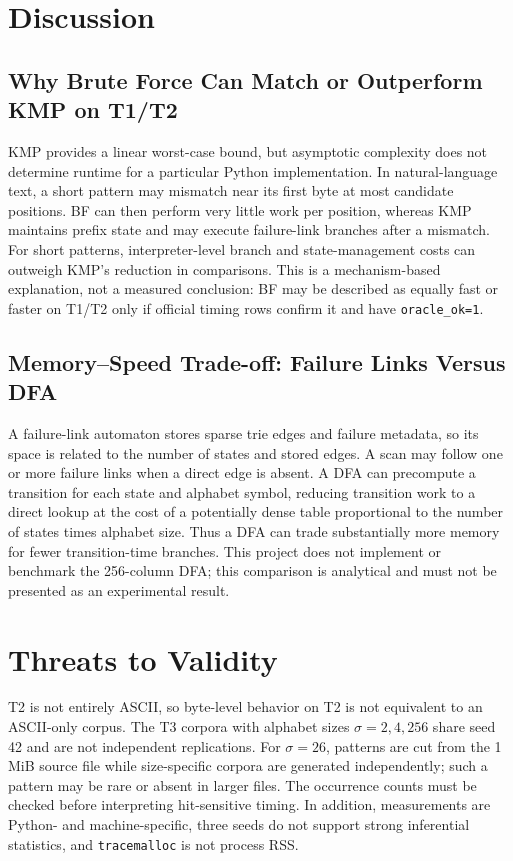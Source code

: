 \documentclass[conference]{IEEEtran}
\begin{document}
\section{Discussion}
\subsection{Why Brute Force Can Match or Outperform KMP on T1/T2}
KMP provides a linear worst-case bound, but asymptotic complexity does not
determine runtime for a particular Python implementation. In natural-language
text, a short pattern may mismatch near its first byte at most candidate
positions. BF can then perform very little work per position, whereas KMP
maintains prefix state and may execute failure-link branches after a mismatch.
For short patterns, interpreter-level branch and state-management costs can
outweigh KMP's reduction in comparisons. This is a mechanism-based explanation,
not a measured conclusion: BF may be described as equally fast or faster on
T1/T2 only if official timing rows confirm it and have \texttt{oracle\_ok=1}.

\subsection{Memory--Speed Trade-off: Failure Links Versus DFA}
A failure-link automaton stores sparse trie edges and failure metadata, so its
space is related to the number of states and stored edges. A scan may follow
one or more failure links when a direct edge is absent. A DFA can precompute a
transition for each state and alphabet symbol, reducing transition work to a
direct lookup at the cost of a potentially dense table proportional to the
number of states times alphabet size. Thus a DFA can trade substantially more
memory for fewer transition-time branches. This project does not implement or
benchmark the 256-column DFA; this comparison is analytical and must not be
presented as an experimental result.

\section{Threats to Validity}
T2 is not entirely ASCII, so byte-level behavior on T2 is not equivalent to an
ASCII-only corpus. The T3 corpora with alphabet sizes $\sigma=2,4,256$ share
seed 42 and are not independent replications. For $\sigma=26$, patterns are
cut from the 1 MiB source file while size-specific corpora are generated
independently; such a pattern may be rare or absent in larger files. The
occurrence counts must be checked before interpreting hit-sensitive timing.
In addition, measurements are Python- and machine-specific, three seeds do not
support strong inferential statistics, and \texttt{tracemalloc} is not process
RSS.
\end{document}
